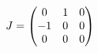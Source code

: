 \documentclass[preview]{standalone}
\begin{document}
\begin{align*}
\special{dvisvgm:raw <g id='unique000'>}J=\begin{pmatrix}0&1&0\\-1&0&0\\0&0&0\end{pmatrix}\special{dvisvgm:raw </g>}
\end{align*}
\end{document}
